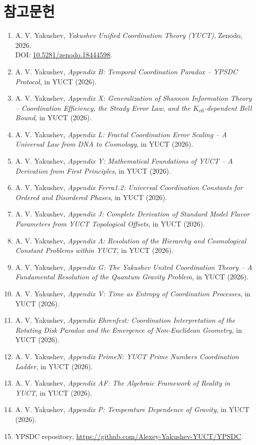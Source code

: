 \documentclass[11pt,a4paper]{article}
\begin{document}
	\section*{참고문헌}
	\begin{enumerate}
		\item A. V. Yakushev, \emph{Yakushev Unified Coordination Theory (YUCT)}, Zenodo, 2026. \\ DOI: \href{https://doi.org/10.5281/zenodo.18444598}{10.5281/zenodo.18444598}.
		\item A. V. Yakushev, \emph{Appendix B: Temporal Coordination Paradox – YPSDC Protocol}, in YUCT (2026).
		\item A. V. Yakushev, \emph{Appendix X: Generalization of Shannon Information Theory – Coordination Efficiency, the Steady Error Law, and the \(K_{\mathrm{eff}}\)-dependent Bell Bound}, in YUCT (2026).
		\item A. V. Yakushev, \emph{Appendix L: Fractal Coordination Error Scaling – A Universal Law from DNA to Cosmology}, in YUCT (2026).
		\item A. V. Yakushev, \emph{Appendix Y: Mathematical Foundations of YUCT – A Derivation from First Principles}, in YUCT (2026).
		\item A. V. Yakushev, \emph{Appendix Ferra1.2: Universal Coordination Constants for Ordered and Disordered Phases}, in YUCT (2026).
		\item A. V. Yakushev, \emph{Appendix J: Complete Derivation of Standard Model Flavor Parameters from YUCT Topological Offsets}, in YUCT (2026).
		\item A. V. Yakushev, \emph{Appendix \(\Lambda\): Resolution of the Hierarchy and Cosmological Constant Problems within YUCT}, in YUCT (2026).
		\item A. V. Yakushev, \emph{Appendix G: The Yakushev United Coordination Theory – A Fundamental Resolution of the Quantum Gravity Problem}, in YUCT (2026).
		\item A. V. Yakushev, \emph{Appendix V: Time as Entropy of Coordination Processes}, in YUCT (2026).
		\item A. V. Yakushev, \emph{Appendix Ehrenfest: Coordination Interpretation of the Rotating Disk Paradox and the Emergence of Non-Euclidean Geometry}, in YUCT (2026).
		\item A. V. Yakushev, \emph{Appendix PrimeN: YUCT Prime Numbers Coordination Ladder}, in YUCT (2026).
		\item A. V. Yakushev, \emph{Appendix AF: The Algebraic Framework of Reality in YUCT}, in YUCT (2026).
		\item A. V. Yakushev, \emph{Appendix P: Temperature Dependence of Gravity}, in YUCT (2026).
		\item YPSDC repository, \url{https://github.com/Alexey-Yakushev-YUCT/YPSDC}.
	\end{enumerate}
	
\end{document}
